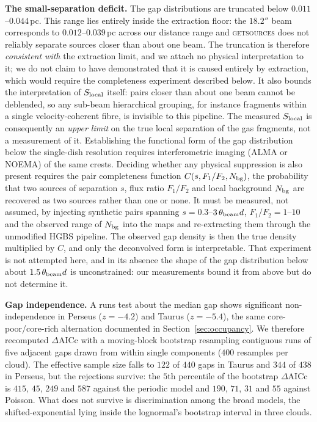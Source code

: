 \documentclass[usenatbib,twoside,twocolumn]{mnras}
\begin{document}
\smallskip\noindent\textbf{The small-separation deficit.} The gap distributions are truncated below $0.011$--$0.044$\,pc. This range lies entirely inside the extraction floor: the $18.2''$ beam corresponds to $0.012$--$0.039$\,pc across our distance range and \textsc{getsources} \citep{Menshchikov2012} does not reliably separate sources closer than about one beam. The truncation is therefore \emph{consistent with} the extraction limit, and we attach no physical interpretation to it; we do not claim to have demonstrated that it is caused entirely by extraction, which would require the completeness experiment described below. It also bounds the interpretation of $S_{\rm local}$ itself: pairs closer than about one beam cannot be deblended, so any sub-beam hierarchical grouping, for instance fragments within a single velocity-coherent fibre, is invisible to this pipeline. The measured $S_{\rm local}$ is consequently an \emph{upper limit} on the true local separation of the gas fragments, not a measurement of it. Establishing the functional form of the gap distribution below the single-dish resolution requires interferometric imaging (ALMA or NOEMA) of the same crests. Deciding whether any physical suppression is also present requires the pair completeness function $C(s,F_1/F_2,N_{\rm bg})$, the probability that two sources of separation $s$, flux ratio $F_1/F_2$ and local background $N_{\rm bg}$ are recovered as two sources rather than one or none. It must be measured, not assumed, by injecting synthetic pairs spanning $s=0.3$--$3\,\theta_{\rm beam}d$, $F_1/F_2=1$--$10$ and the observed range of $N_{\rm bg}$ into the maps and re-extracting them through the unmodified HGBS pipeline. The observed gap density is then the true density multiplied by $C$, and only the deconvolved form is interpretable. That experiment is not attempted here, and in its absence the shape of the gap distribution below about $1.5\,\theta_{\rm beam}d$ is unconstrained: our measurements bound it from above but do not determine it.

\smallskip\noindent\textbf{Gap independence.} A runs test about the median gap shows significant non-independence in Perseus ($z=-4.2$) and Taurus ($z=-5.4$), the same core-poor/core-rich alternation documented in Section~\ref{sec:occupancy}. We therefore recomputed $\Delta$AICc with a moving-block bootstrap resampling contiguous runs of five adjacent gaps drawn from within single components ($400$ resamples per cloud). The effective sample size falls to $122$ of $440$ gaps in Taurus and $344$ of $438$ in Perseus, but the rejections survive: the $5$th percentile of the bootstrap $\Delta$AICc is $415$, $45$, $249$ and $587$ against the periodic model and $190$, $71$, $31$ and $55$ against Poisson. What does not survive is discrimination among the broad models, the shifted-exponential lying inside the lognormal's bootstrap interval in three clouds.
\end{document}
